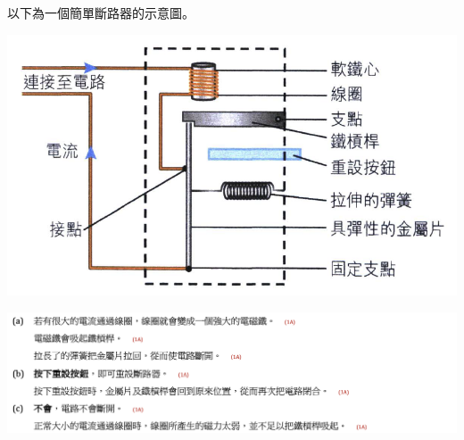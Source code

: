 {
    以下為一個簡單斷路器的示意圖。
    \par{\par\centering\includegraphics[width=.5\textwidth]{./img/ch4_magnetostatics_lq_2024-06-23-21-13-29.png}\par}
}{\par{\par\centering\includegraphics[width=\textwidth]{./img/ch4_magnetostatics_lq_2024-06-23-21-18-33.png}\par}}

